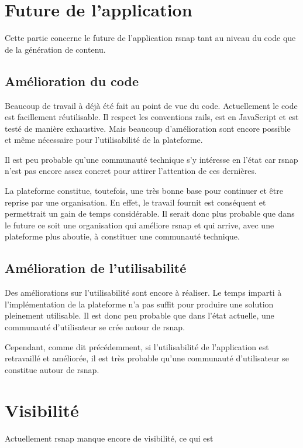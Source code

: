 \section{Future de l'application}
Cette partie concerne le future de l'application \gls{rsnap} tant au niveau du code que de la génération de contenu.

\subsection{Amélioration du code}
Beaucoup de travail à déjà été fait au point de vue du code. Actuellement le code est facillement réutilisable. Il respect les conventions \gls{rails}, est en JavaScript et est testé de manière exhaustive. Mais beaucoup d'amélioration sont encore possible et même nécessaire pour l'utilisabilité de la plateforme.

Il est peu probable qu'une communauté technique s'y intéresse en l'état car \gls{rsnap} n'est pas encore assez concret pour attirer l'attention de ces dernières.

La plateforme constitue, toutefois, une très bonne base pour continuer et être reprise par une organisation. En effet, le travail fournit est conséquent et permettrait un gain de temps considérable. Il serait donc plus probable que dans le future ce soit une organisation qui améliore \gls{rsnap} et qui arrive, avec une plateforme plus aboutie, à constituer une communauté technique.

\subsection{Amélioration de l'utilisabilité}
Des améliorations sur l'utilisabilité sont encore à réaliser. Le temps imparti à l'implémentation de la plateforme n'a pas suffit pour produire une solution pleinement utilisable. Il est donc peu probable que dans l'état actuelle, une communauté d'utilisateur se crée autour de \gls{rsnap}.

Cependant, comme dit précédemment, si l'utilisabilité de l'application est retravaillé et améliorée, il est très probable qu'une communauté d'utilisateur se constitue autour de \gls{rsnap}.

\section{Visibilité}
Actuellement \gls{rsnap} manque encore de visibilité, ce qui est 


%
%
%
%
%
%
